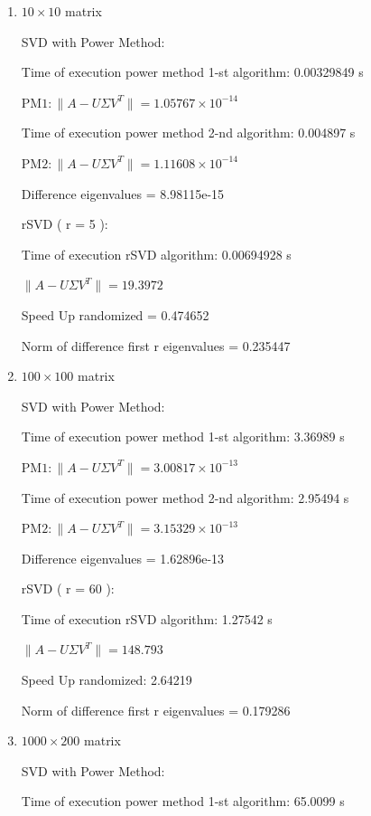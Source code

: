 \documentclass{article}
\begin{document}
\begin{enumerate}
\item $10 \times 10$ matrix

SVD with Power Method:

Time of execution power method 1-st algorithm: 0.00329849 s

\( \text{PM1} : \| A - U \Sigma V^T \| = 1.05767 \times 10^{-14} \)

Time of execution power method 2-nd algorithm: 0.004897 s

\( \text{PM2} : \| A - U \Sigma V^T \| = 1.11608 \times 10^{-14} \)

Difference eigenvalues = 8.98115e-15

\vspace{\baselineskip}
rSVD ( r = 5 ):

Time of execution rSVD algorithm: 0.00694928 s

\(\| A - U \Sigma V^T \| = 19.3972 \)

Speed Up randomized = 0.474652

Norm of difference first r eigenvalues = 0.235447

\vspace{\baselineskip}
\item $100 \times 100$ matrix

SVD with Power Method:

Time of execution power method 1-st algorithm: 3.36989 s

\( \text{PM1} : \| A - U \Sigma V^T \| = 3.00817 \times 10^{-13} \)

Time of execution power method 2-nd algorithm: 2.95494 s

\( \text{PM2} : \| A - U \Sigma V^T \| = 3.15329 \times 10^{-13} \)

Difference eigenvalues = 1.62896e-13

\vspace{\baselineskip}
rSVD ( r = 60 ):

Time of execution rSVD algorithm: 1.27542 s

\(\| A - U \Sigma V^T \| = 148.793 \)

Speed Up randomized: 2.64219

Norm of difference first r eigenvalues = 0.179286

\vspace{\baselineskip}
\item $1000 \times 200$ matrix

SVD with Power Method:

Time of execution power method 1-st algorithm: 65.0099 s


\end{enumerate}
\end{document}
